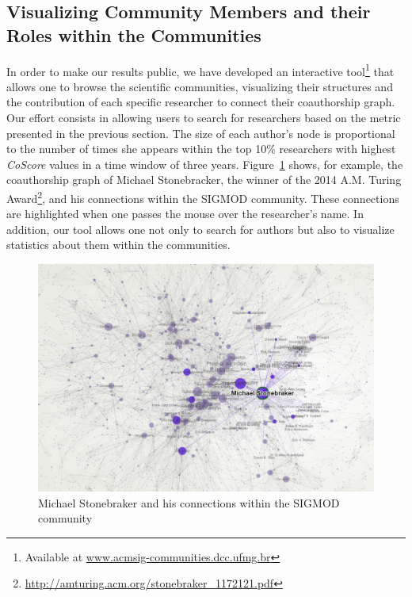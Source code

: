 \documentclass{sig-alternate-10pt}
\begin{document}
\subsection{Visualizing Community Members and their Roles within the Communities}

In order to make our results public, we have developed an interactive tool\footnote{Available at \url{www.acmsig-communities.dcc.ufmg.br}} that allows one to browse the scientific communities, visualizing their structures and the contribution of each specific researcher to connect their coauthorship graph. Our effort consists in allowing users to search for researchers based on the metric presented in the previous section. The size of each author's node is proportional to the number of times she appears within the top 10\% researchers with highest \textit{CoScore} values in a time window of three years. Figure~\ref{fig:stonebraker} shows, for example, the coauthorship graph of Michael Stonebracker, the winner of the 2014 A.M. Turing Award\footnote{\url{http://amturing.acm.org/stonebraker_1172121.pdf}}, and his connections within the SIGMOD community. These connections are highlighted when one passes the mouse over the researcher's name. In addition, our tool allows one not only to search for authors but also to visualize statistics about them within the communities.


\begin{figure}[!htb]
\centering
\includegraphics[scale=.28]{graficos/stonebraker.pdf}
\caption{Michael Stonebraker and his connections within the SIGMOD community}
\label{fig:stonebraker}
\end{figure}
\end{document}
